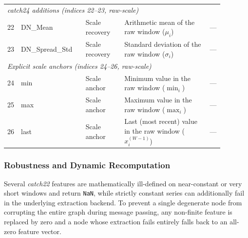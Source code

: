 {\begin{longtable}{@{}c
  >{\ttfamily\raggedright\arraybackslash}p{0.30\linewidth}
  >{\raggedright\arraybackslash}p{0.18\linewidth}
  >{\raggedright\arraybackslash}p{0.40\linewidth}
  c@{}}
\multicolumn{5}{l}{\textit{catch24 additions (indices 22--23, raw-scale)}} \\[2pt]
22 & DN\_\allowbreak Mean                                      & Scale recovery             & Arithmetic mean of the raw window ($\mu_i$)                  & ---           \\
23 & DN\_\allowbreak Spread\_\allowbreak Std                               & Scale recovery             & Standard deviation of the raw window ($\sigma_i$)            & ---           \\[4pt]

\multicolumn{5}{l}{\textit{Explicit scale anchors (indices 24--26, raw-scale)}} \\[2pt]
24 & min                                           & Scale anchor               & Minimum value in the raw window ($\min_i$)                   & ---           \\
25 & max                                           & Scale anchor               & Maximum value in the raw window ($\max_i$)                   & ---           \\
26 & last                                          & Scale anchor               & Last (most recent) value in the raw window ($x_i^{(W-1)}$)  & ---           \\

\end{longtable}
}

\subsubsection{Robustness and Dynamic Recomputation}

Several \textit{catch22} features are mathematically ill-defined on
near-constant or very short windows and return \texttt{NaN}, while strictly
constant series can additionally fail in the underlying extraction backend.
To prevent a single degenerate node from corrupting the entire graph during
message passing, any non-finite feature is replaced by zero and a node whose
extraction fails entirely falls back to an all-zero feature vector.

